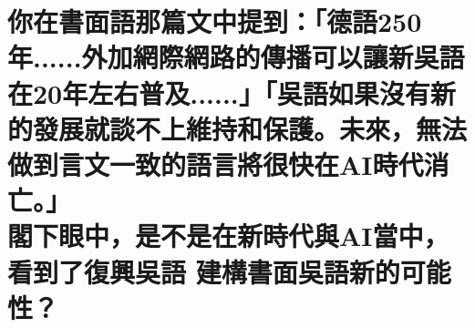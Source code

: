 %
% 

\chapter[你在書面語那篇文中提到：「德語250年......外加網際網路的傳播可以讓新吳語在20年左右普及......」「吳語如果沒有新的發展就談不上維持和保護。未來，無法做到言文一致的語言將很快在AI時代消亡。」 閣下眼中，是不是在新時代與AI當中， 看到了復興吳語 建構書面吳語新的可能性？]{你在書面語那篇文中提到：「德語250年......外加網際網路的傳播可以讓新吳語在20年左右普及......」「吳語如果沒有新的發展就談不上維持和保護。未來，無法做到言文一致的語言將很快在AI時代消亡。」 \\[0.35em] 閣下眼中，是不是在新時代與AI當中， \\[0.35em] 看到了復興吳語 建構書面吳語新的可能性？}


